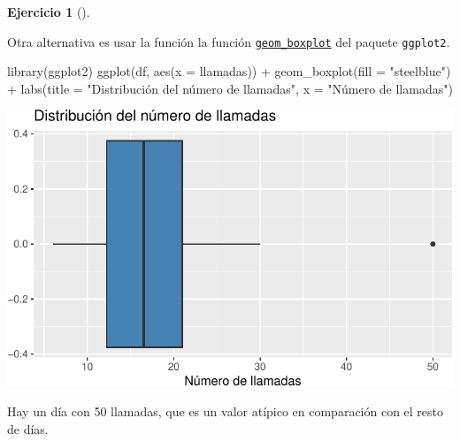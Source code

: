 \documentclass[
  a4paper,
]{scrreport}
\newenvironment{Shaded}{\begin{snugshade}}{\end{snugshade}}
\newcommand{\AttributeTok}[1]{\textcolor[rgb]{0.40,0.45,0.13}{#1}}
\newcommand{\FunctionTok}[1]{\textcolor[rgb]{0.28,0.35,0.67}{#1}}
\newcommand{\NormalTok}[1]{\textcolor[rgb]{0.00,0.23,0.31}{#1}}
\newcommand{\SpecialCharTok}[1]{\textcolor[rgb]{0.37,0.37,0.37}{#1}}
\newcommand{\StringTok}[1]{\textcolor[rgb]{0.13,0.47,0.30}{#1}}
\theoremstyle{definition}
\newtheorem{exercise}{Ejercicio}[chapter]
\theoremstyle{remark}
\begin{document}
\begin{exercise}[]
\begin{enumerate}
\begin{tcolorbox}
  \end{tcolorbox}

  \begin{tcolorbox}[enhanced jigsaw, toprule=.15mm, rightrule=.15mm, arc=.35mm, colback=white, colbacktitle=quarto-callout-tip-color!10!white, toptitle=1mm, left=2mm, colframe=quarto-callout-tip-color-frame, opacityback=0, breakable, opacitybacktitle=0.6, bottomtitle=1mm, titlerule=0mm, title=\textcolor{quarto-callout-tip-color}{\faLightbulb}\hspace{0.5em}{Solución 2}, bottomrule=.15mm, coltitle=black, leftrule=.75mm]

  Otra alternativa es usar la función la función
  \href{https://aprendeconalf.es/manual-r/07-graficos.html\#diagramas-de-cajas}{\texttt{geom\_boxplot}}
  del paquete \texttt{ggplot2}.

\begin{Shaded}
\begin{Highlighting}[]
\FunctionTok{library}\NormalTok{(ggplot2)}
\FunctionTok{ggplot}\NormalTok{(df, }\FunctionTok{aes}\NormalTok{(}\AttributeTok{x =}\NormalTok{ llamadas)) }\SpecialCharTok{+}
    \FunctionTok{geom\_boxplot}\NormalTok{(}\AttributeTok{fill =} \StringTok{"steelblue"}\NormalTok{) }\SpecialCharTok{+}
    \FunctionTok{labs}\NormalTok{(}\AttributeTok{title =} \StringTok{"Distribución del número de llamadas"}\NormalTok{, }\AttributeTok{x =} \StringTok{"Número de llamadas"}\NormalTok{)}
\end{Highlighting}
\end{Shaded}

  \includegraphics{03-frecuencias-graficos_files/figure-pdf/unnamed-chunk-12-1.pdf}

  Hay un día con 50 llamadas, que es un valor atípico en comparación con
  el resto de días.


\end{tcolorbox}
\end{enumerate}
\end{exercise}
\end{document}
